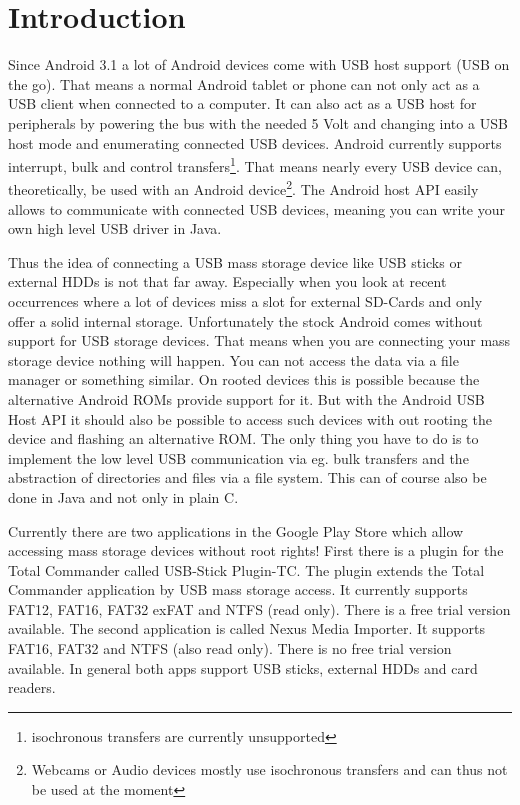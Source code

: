 \chapter{Introduction}
\label{chapter:Introduction}



Since Android 3.1 a lot of Android devices come with USB host support (USB on the go). That means a normal Android tablet or phone can not only act as a USB client when connected to a computer. It can also act as a USB host for peripherals by powering the bus with the needed 5 Volt and changing into a USB host mode and enumerating connected USB devices\cite{android_usb_host}. Android currently supports interrupt, bulk and control transfers\footnote{isochronous transfers are currently unsupported\cite{android_usb_constants}}. That means nearly every USB device can, theoretically, be used with an Android device\footnote{Webcams or Audio devices mostly use isochronous transfers and can thus not be used at the moment}. The Android host API easily allows to communicate with connected USB devices, meaning you can write your own high level USB driver in Java.

Thus the idea of connecting a USB mass storage device like USB sticks or external HDDs is not that far away. Especially when you look at recent occurrences where a lot of devices miss a slot for external SD-Cards and only offer a solid internal storage. Unfortunately the stock Android comes without support for USB storage devices. That means when you are connecting your mass storage device nothing will happen. You can not access the data via a file manager or something similar. On rooted devices this is possible because the alternative Android ROMs provide support for it. But with the Android USB Host API it should also be possible to access such devices with out rooting the device and flashing an alternative ROM. The only thing you have to do is to implement the low level USB communication via eg. bulk transfers and the abstraction of directories and files via a file system. This can of course also be done in Java and not only in plain C.

Currently there are two applications in the Google Play Store which allow accessing mass storage devices without root rights! First there is a plugin for the Total Commander called USB-Stick Plugin-TC. The plugin extends the Total Commander application by USB mass storage access. It currently supports FAT12, FAT16, FAT32 exFAT and NTFS (read only). There is a free trial version available. The second application is called Nexus Media Importer. It supports FAT16, FAT32 and NTFS (also read only). There is no free trial version available. In general both apps support USB sticks, external HDDs and card readers.


